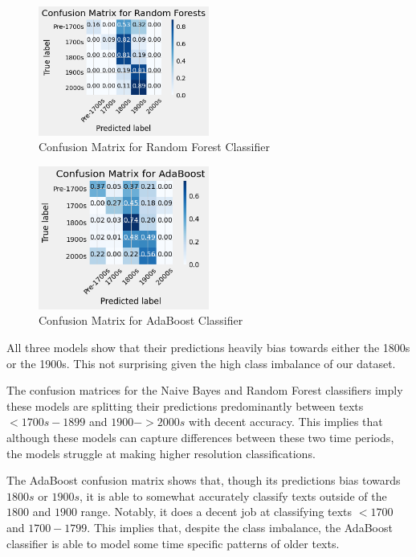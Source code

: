 \documentclass{article}
\begin{document}
\begin{figure}[h]
  \centering
  \includegraphics[width=0.5\textwidth]{cm_rf.png}
  \caption{Confusion Matrix for Random Forest Classifier}
  \end{figure}

\begin{figure}[h]
  \centering
  \includegraphics[width=0.5\textwidth]{cm_adaboost.png}
  \caption{Confusion Matrix for AdaBoost Classifier}
  \end{figure}

All three models show that their predictions heavily bias towards either the 1800s or the 1900s. This not
surprising given the high class imbalance of our dataset.

The confusion matrices for the Naive Bayes and Random Forest classifiers imply these models are splitting
their predictions predominantly between texts $<1700s-1899$ and $1900->2000s$ with decent accuracy. This
implies that although these models can capture differences between these two time periods, the models struggle
at making higher resolution classifications.

The AdaBoost confusion matrix shows that, though its predictions bias towards $1800s$ or $1900s$, it is
able to somewhat accurately classify texts outside of the $1800$ and $1900$ range. Notably, it does a
decent job at classifying texts $<1700$ and $1700-1799$. This implies that, despite the class imbalance,
the AdaBoost classifier is able to model some time specific patterns of older texts.
\end{document}
